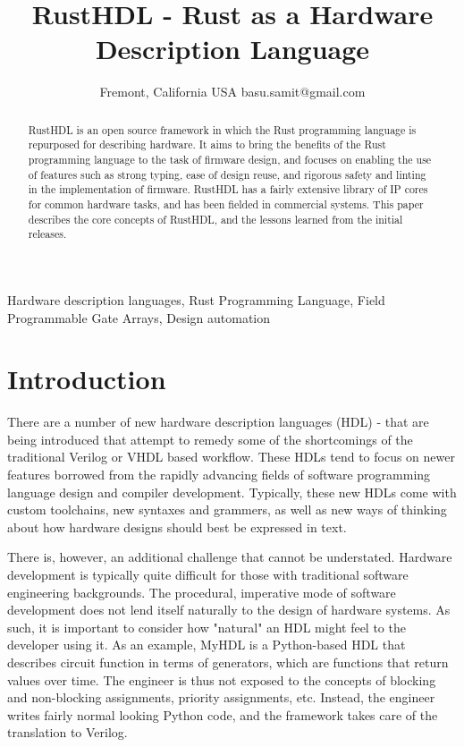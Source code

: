 \documentclass[conference]{IEEEtran}
\begin{document}
\title{RustHDL - Rust as a Hardware Description Language}

\author{
  Fremont, California
  USA
  basu.samit@gmail.com
}

\maketitle

\begin{abstract}
  RustHDL is an open source framework in which the Rust programming language is repurposed for 
  describing hardware.  It aims to bring the benefits of the Rust programming language to the 
  task of firmware design, and focuses on enabling the use
  of features such as strong typing, ease of design reuse, and rigorous safety and linting in
  the implementation of firmware.  RustHDL has a fairly extensive library of IP cores for 
  common hardware tasks, and has been fielded in commercial systems.  This paper describes the
  core concepts of RustHDL, and the lessons learned from the initial releases.
\end{abstract}

\begin{IEEEkeywords}
  Hardware description languages, Rust Programming Language, Field Programmable Gate Arrays,
  Design automation
\end{IEEEkeywords}


\section{Introduction}
There are a number of new hardware description languages (HDL) \cite{b1}-\cite{b5} that are being introduced that
attempt to remedy some of the shortcomings of the traditional Verilog or VHDL based workflow.
These HDLs tend to focus on newer features borrowed from the rapidly advancing fields of
software programming language design and compiler development.  Typically, these new HDLs
come with custom toolchains, new syntaxes and grammers, as well as new ways of thinking about
how hardware designs should best be expressed in text.

There is, however, an additional challenge that cannot be understated.  Hardware development
is typically quite difficult for those with traditional software engineering backgrounds.
The procedural, imperative mode of software development does not lend itself naturally to
the design of hardware systems.  As such, it is important to consider how "natural" an HDL
might feel to the developer using it.  As an example, MyHDL \cite{b3} is a Python-based HDL
that describes circuit function in terms of generators, which are functions that return
values over time.  The engineer is thus not exposed to the concepts of blocking and non-blocking 
assignments, priority assignments, etc.  Instead, the engineer writes fairly normal looking 
Python code, and the framework takes care of the translation to Verilog.
\end{document}
